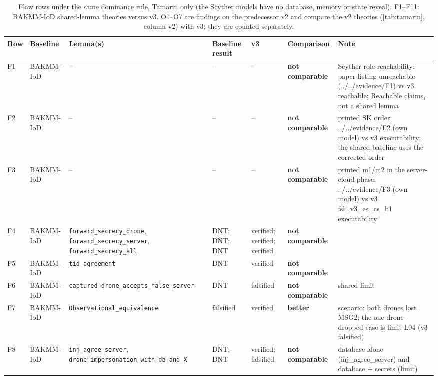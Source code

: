 \begin{table}[!t]
\centering
\footnotesize
\caption{Flaw rows under the same dominance rule, Tamarin only (the Scyther models have no database, memory or state reveal). F1--F11: BAKMM-IoD shared-lemma theories versus v3. O1--O7 are findings on the predecessor v2 and compare the v2 theories (\cref{tab:tamarin}, column v2) with v3; they are counted separately.}
\label{tab:flawrows}
\setlength{\tabcolsep}{3pt}
\begin{tabular}{llp{3.0cm}p{2.1cm}p{1.7cm}lp{3.6cm}}
\toprule
Row & Baseline & Lemma(s) & Baseline result & v3 & Comparison & Note \\
\midrule
F1 & BAKMM-IoD & -- & -- & -- & \textbf{not comparable} & Scyther role reachability: paper listing unreachable (../../evidence/F1) vs v3 reachable; Reachable claims, not a shared lemma \\
F2 & BAKMM-IoD & -- & -- & -- & \textbf{not comparable} & printed SK order: ../../evidence/F2 (own model) vs v3 executability; the shared baseline uses the corrected order \\
F3 & BAKMM-IoD & -- & -- & -- & \textbf{not comparable} & printed m1/m2 in the server-cloud phase: ../../evidence/F3 (own model) vs v3 fsl\_v3\_es\_cs\_b1 executability \\
F4 & BAKMM-IoD & \texttt{forward\_\allowbreak{}secrecy\_\allowbreak{}drone}, \texttt{forward\_\allowbreak{}secrecy\_\allowbreak{}server}, \texttt{forward\_\allowbreak{}secrecy\_\allowbreak{}all} & DNT; DNT; DNT & verified; verified; verified & \textbf{not comparable} &  \\
F5 & BAKMM-IoD & \texttt{tid\_\allowbreak{}agreement} & DNT & verified & \textbf{not comparable} &  \\
F6 & BAKMM-IoD & \texttt{captured\_\allowbreak{}drone\_\allowbreak{}accepts\_\allowbreak{}false\_\allowbreak{}server} & DNT & falsified & \textbf{not comparable} & shared limit \\
F7 & BAKMM-IoD & \texttt{Observational\_\allowbreak{}equivalence} & falsified & verified & \textbf{better} & scenario: both drones lost MSG2; the one-drone-dropped case is limit L04 (v3 falsified) \\
F8 & BAKMM-IoD & \texttt{inj\_\allowbreak{}agree\_\allowbreak{}server}, \texttt{drone\_\allowbreak{}impersonation\_\allowbreak{}with\_\allowbreak{}db\_\allowbreak{}and\_\allowbreak{}X} & DNT; DNT & verified; falsified & \textbf{not comparable} & database alone (inj\_agree\_server) and database + secrets (limit) \\

\end{tabular}
\end{table}

